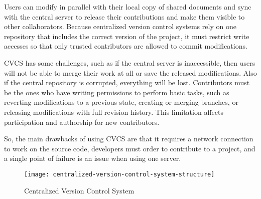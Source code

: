 Users can modify in parallel with their local copy of shared documents and sync with the central server to release their contributions and make them visible to other collaborators. Because centralized version control systems rely on one repository that includes the correct version of the project, it must restrict write accesses so that only trusted contributors are allowed to commit modifications.

CVCS has some challenges, such as if the central server is inaccessible, then users will not be able to merge their work at all or save the released modifications. Also if the central repository is corrupted, everything will be lost. Contributors must be the ones who have writing permissions to perform basic tasks, such as reverting modifications to a previous state, creating or merging branches, or releasing modifications with full revision history. This limitation affects participation and authorship for new contributors.

So, the main drawbacks of using CVCS are that it requires a network connection to work on the source code, developers must order to contribute to a project, and a single point of failure is an issue when using one server.

\begin{figure}[h]
    \centering
    \texttt{[image: centralized-version-control-system-structure]}
    \caption{Centralized Version Control System}
    \label{fig:cvcs-structure}
\end{figure}

